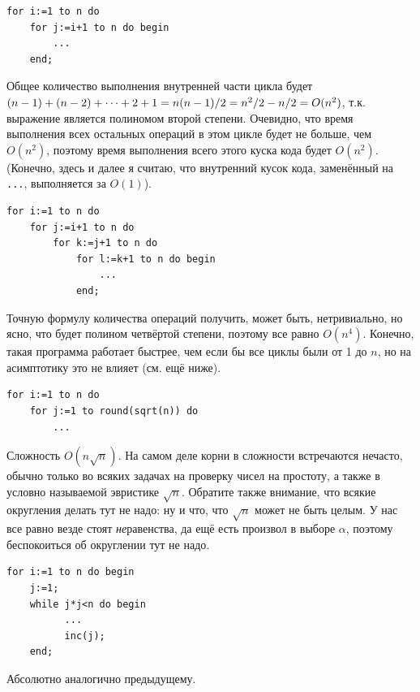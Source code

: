 \documentclass[a4paper,10pt]{problems}
\begin{document}

\begin{codesample}\begin{verbatim}
for i:=1 to n do
    for j:=i+1 to n do begin
        ...
    end;
\end{verbatim}\end{codesample}
Общее количество выполнения внутренней части цикла будет 
$(n-1)+(n-2)+\dots+2+1\hm=n(n-1)/2\hm=n^2/2-n/2\hm=O(n^2)$, т.к. выражение является полиномом второй 
степени. Очевидно, что время выполнения всех остальных операций в этом цикле будет не больше, 
чем $O(n^2)$, поэтому время выполнения всего этого куска кода будет $O(n^2)$. (Конечно, здесь 
и далее я считаю, что внутренний кусок кода, заменённый на \texttt{...}, выполняется за 
$O(1)$).

\begin{codesample}\begin{verbatim}
for i:=1 to n do
    for j:=i+1 to n do
        for k:=j+1 to n do
            for l:=k+1 to n do begin
                ...
            end;
\end{verbatim}\end{codesample}
Точную формулу количества операций получить, может быть, нетривиально, но ясно, 
что будет полином четвёртой степени, поэтому все равно $O(n^4)$. Конечно, такая 
программа работает быстрее, чем если бы все циклы были от 1 до $n$, но на асимптотику это не влияет (см. ещё ниже).

\begin{codesampleo}\begin{verbatim}
for i:=1 to n do
    for j:=1 to round(sqrt(n)) do
        ...
\end{verbatim}\end{codesampleo}
Сложность $O(n\sqrt{n})$. На самом деле корни в сложности встречаются нечасто, обычно только 
во всяких задачах на проверку чисел на простоту, а также в условно называемой эвристике 
$\sqrt{n}$. Обратите также внимание, что всякие округления 
делать тут не надо: ну и что, что $\sqrt n$ может не быть целым. У нас все равно везде стоят 
\textit{не}равенства, да ещё есть произвол в выборе $\alpha$, поэтому беспокоиться об 
округлении тут не надо.

\begin{codesampleo}\begin{verbatim}
for i:=1 to n do begin
    j:=1;
    while j*j<n do begin
          ...
          inc(j);
    end;
\end{verbatim}\end{codesampleo}
Абсолютно аналогично предыдущему.
\end{document}
